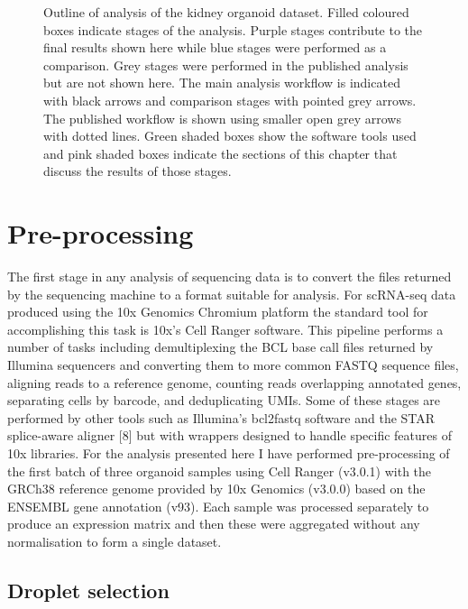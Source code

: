 \documentclass[11pt,a4paper,titlepage,twoside,openright]{style/unimelbthesis}
\theoremstyle{definition}
\theoremstyle{definition}
\theoremstyle{definition}
\theoremstyle{remark}
\begin{document}
\begin{mainmatter}
\begin{figure}
{}

\caption[Outline of analysis of the kidney organoid dataset.]{Outline of analysis of the kidney organoid dataset. Filled coloured boxes indicate stages of the analysis. Purple stages contribute to the final results shown here while blue stages were performed as a comparison. Grey stages were performed in the published analysis but are not shown here. The main analysis workflow is indicated with black arrows and comparison stages with pointed grey arrows. The published workflow is shown using smaller open grey arrows with dotted lines. Green shaded boxes show the software tools used and pink shaded boxes indicate the sections of this chapter that discuss the results of those stages.}\label{fig:workflow}
\end{figure}





\hypertarget{pre-processing}{%
\section{Pre-processing}\label{pre-processing}}

The first stage in any analysis of sequencing data is to convert the files returned by the sequencing machine to a format suitable for analysis. For scRNA-seq data produced using the 10x Genomics Chromium platform the standard tool for accomplishing this task is 10x's Cell Ranger software. This pipeline performs a number of tasks including demultiplexing the BCL base call files returned by Illumina sequencers and converting them to more common FASTQ sequence files, aligning reads to a reference genome, counting reads overlapping annotated genes, separating cells by barcode, and deduplicating UMIs. Some of these stages are performed by other tools such as Illumina's bcl2fastq software and the STAR splice-aware aligner {[}8{]} but with wrappers designed to handle specific features of 10x libraries. For the analysis presented here I have performed pre-processing of the first batch of three organoid samples using Cell Ranger (v3.0.1) with the GRCh38 reference genome provided by 10x Genomics (v3.0.0) based on the ENSEMBL gene annotation (v93). Each sample was processed separately to produce an expression matrix and then these were aggregated without any normalisation to form a single dataset.

\hypertarget{droplet-selection}{%
\subsection{Droplet selection}\label{droplet-selection}}


\end{mainmatter}
\end{document}
